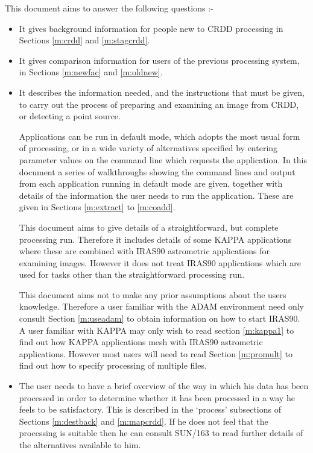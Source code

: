 \documentclass[twoside,11pt]{article}
\newcommand{\xref}[3]{#1}
\begin{document}
This document aims to answer the following questions :-
\begin{itemize}

\item It gives background information for people new to CRDD processing in
Sections \ref{m:crdd} and \ref{m:stagcrdd}.

\item It gives comparison information for users of the previous processing
system, in Sections \ref{m:newfac} and \ref{m:oldnew}.

\item It describes the information needed, and the instructions that must be
given, to carry out the process of preparing and examining an image from CRDD,
or detecting a point source.

Applications can be run in default mode, which adopts the most usual form of
processing, or in a wide variety of alternatives specified by entering parameter
values on the command line which requests the application. In this document a
series of walkthroughs showing the command lines and output from each
application running in default mode are given, together with details of the
information the user needs to run the application. These are given in
Sections \ref{m:extract} to \ref{m:coadd}.

This document aims to give details of a straightforward, but complete processing
run. Therefore it includes details of some KAPPA applications where these are
combined with IRAS90 astrometric applications for examining images. However it
does not treat IRAS90 applications which are used for tasks other than the
straightforward processing run.

This document aims not to make any prior assumptions about the users knowledge.
Therefore a user familiar with the ADAM environment need only consult Section
\ref{m:useadam} to obtain information on how to start IRAS90. A user familiar
with KAPPA may only wish to read section \ref{m:kappa1} to find out how KAPPA
applications mesh with IRAS90 astrometric applications. However most users will
need to read Section \ref{m:promult} to find out how to specify processing of
multiple files. 

\item The user needs to have a brief overview of the way in which his data has
been processed in order to determine whether it has been processed in a way he
feels to be satisfactory. This is described in the `process' subsections of
Sections \ref{m:destback} and \ref{m:mapcrdd}. If he does not feel that
the processing is suitable then he can consult
\xref{SUN/163}{sun163}{} to read further details
of the alternatives available to him.


\end{itemize}
\end{document}
